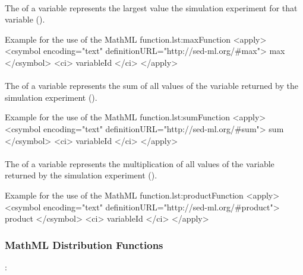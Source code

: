 \paragraph*{}
\label{fun:max}
The  of a variable represents the largest value the simulation experiment for that variable ().
\begin{myXmlLst}{Example for the use of the MathML  function.}{lst:maxFunction}
<apply>
 	<csymbol encoding="text" definitionURL="http://sed-ml.org/#max">
 		max
 	</csymbol>
 	<ci> variableId </ci>
</apply>
\end{myXmlLst}

\paragraph*{}
\label{fun:sum}
The  of a variable represents the sum of all values of the variable returned by the simulation experiment ().
\begin{myXmlLst}{Example for the use of the MathML  function.}{lst:sumFunction}
<apply>
 	<csymbol encoding="text" definitionURL="http://sed-ml.org/#sum">
 		sum
 	</csymbol>
 	<ci> variableId </ci>
</apply>
\end{myXmlLst}

\paragraph*{}
\label{fun:product}
The  of a variable represents the multiplication of all values of the variable returned by the simulation experiment ().
\begin{myXmlLst}{Example for the use of the MathML  function.}{lst:productFunction}
<apply>
 	<csymbol encoding="text" definitionURL="http://sed-ml.org/#product">
 		product
 	</csymbol>
 	<ci> variableId </ci>
</apply>
\end{myXmlLst}


\subsubsection{MathML Distribution Functions}
:

